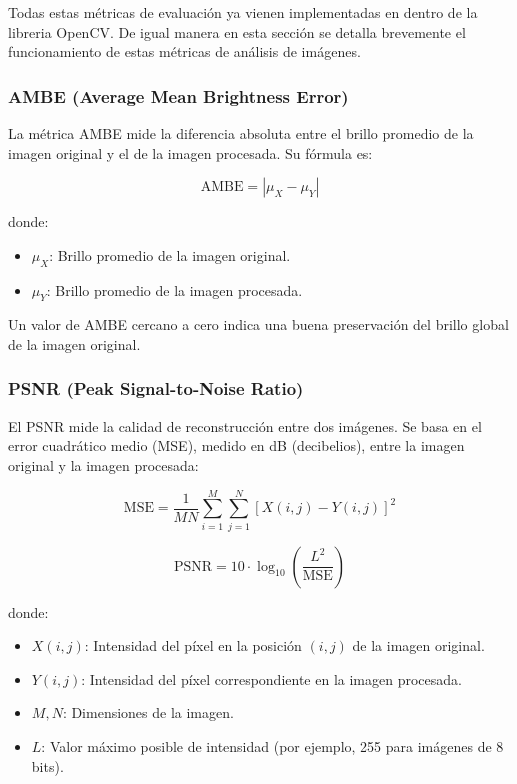 \documentclass[sigchi]{acmart}
\begin{document}
Todas estas métricas de evaluación ya vienen implementadas en dentro de la libreria OpenCV. De igual manera
en esta sección se detalla brevemente el funcionamiento de estas métricas de análisis de imágenes.

\subsubsection{\textbf{AMBE (Average Mean Brightness Error)}}
La métrica AMBE mide la diferencia absoluta entre el brillo promedio de la imagen original y el
de la imagen procesada. Su fórmula es:

\begin{equation}
	\text{AMBE} = \left| \mu_X - \mu_Y \right|
\end{equation}

donde:
\begin{itemize}
	\item $\mu_X$: Brillo promedio de la imagen original.
	\item $\mu_Y$: Brillo promedio de la imagen procesada.
\end{itemize}

Un valor de AMBE cercano a cero indica una buena preservación del brillo global de la imagen original.

\subsubsection{\textbf{PSNR (Peak Signal-to-Noise Ratio)}}
El PSNR mide la calidad de reconstrucción entre dos imágenes. Se basa en el error cuadrático
medio (MSE), medido en dB (decibelios), entre la imagen original y la imagen procesada:

\begin{equation}
	\text{MSE} = \frac{1}{MN} \sum_{i=1}^{M} \sum_{j=1}^{N} \left[ X(i,j) - Y(i,j) \right]^2
\end{equation}

\begin{equation}
	\text{PSNR} = 10 \cdot \log_{10} \left( \frac{L^2}{\text{MSE}} \right)
\end{equation}

donde:
\begin{itemize}
	\item $X(i,j)$: Intensidad del píxel en la posición $(i,j)$ de la imagen original.
	\item $Y(i,j)$: Intensidad del píxel correspondiente en la imagen procesada.
	\item $M, N$: Dimensiones de la imagen.
	\item $L$: Valor máximo posible de intensidad (por ejemplo, 255 para imágenes de 8 bits).
\end{itemize}
\end{document}
